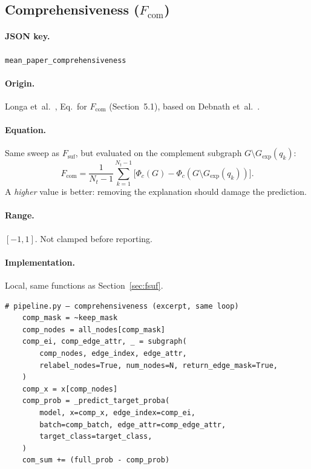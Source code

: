 \documentclass[11pt,a4paper]{article}
\newcommand{\jsonkey}[1]{\texttt{#1}}
\newcommand{\model}{\Phi}
\newcommand{\Gcomp}{G \setminus G_{\mathrm{exp}}}
\begin{document}
\subsection{Comprehensiveness (\texorpdfstring{$F_{\mathrm{com}}$}{Fcom})}
\label{sec:fcom}

\paragraph{JSON key.} \jsonkey{mean\_paper\_comprehensiveness}

\paragraph{Origin.} Longa et~al.~\cite{longa2025}, Eq.\ for
$F_{\mathrm{com}}$ (Section~5.1), based on Debnath et~al.~\cite{debnath2019}.

\paragraph{Equation.}
Same sweep as $F_{\mathrm{suf}}$, but evaluated on the complement subgraph
$\Gcomp(q_k)$:
\begin{equation}
  F_{\mathrm{com}} = \frac{1}{N_t - 1} \sum_{k=1}^{N_t - 1}
    \bigl[\model_c(G) - \model_c(\Gcomp(q_k))\bigr].
  \label{eq:fcom}
\end{equation}
A \emph{higher} value is better: removing the explanation should damage the
prediction.

\paragraph{Range.} $[-1, 1]$.  Not clamped before reporting.

\paragraph{Implementation.} Local, same functions as
Section~\ref{sec:fsuf}.

\begin{verbatim}
# pipeline.py — comprehensiveness (excerpt, same loop)
    comp_mask = ~keep_mask
    comp_nodes = all_nodes[comp_mask]
    comp_ei, comp_edge_attr, _ = subgraph(
        comp_nodes, edge_index, edge_attr,
        relabel_nodes=True, num_nodes=N, return_edge_mask=True,
    )
    comp_x = x[comp_nodes]
    comp_prob = _predict_target_proba(
        model, x=comp_x, edge_index=comp_ei,
        batch=comp_batch, edge_attr=comp_edge_attr,
        target_class=target_class,
    )
    com_sum += (full_prob - comp_prob)
\end{verbatim}
\end{document}
